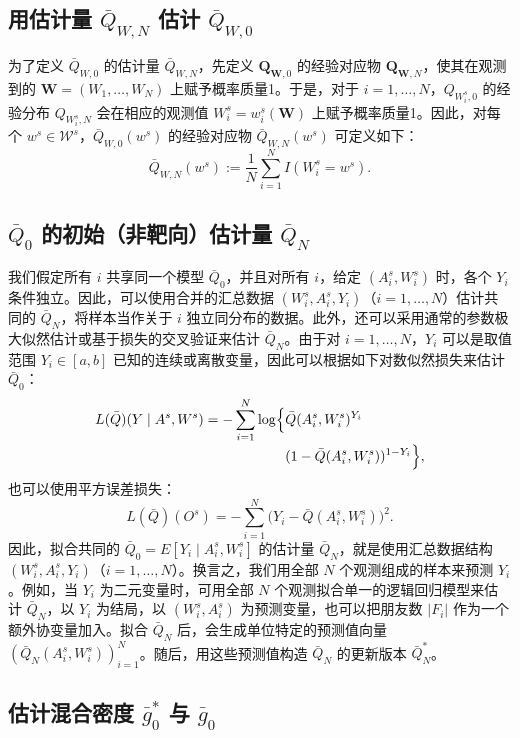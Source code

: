 \subsection{用估计量 \texorpdfstring{$\bar Q_{W,N}$}{QW,N} 估计 \texorpdfstring{$\bar Q_{W,0}$}{QW,0}}

为了定义 $\bar Q_{W,0}$ 的估计量 $\bar Q_{W,N}$，先定义 $\bm Q_{\bm W,0}$ 的经验对应物 $\bm Q_{\bm W,N}$，使其在观测到的 $\bm W=(W_1,\ldots,W_N)$ 上赋予概率质量1。于是，对于 $i=1,\ldots,N$，$Q_{W_i^s,0}$ 的经验分布 $Q_{W_i^s,N}$ 会在相应的观测值 $W_i^s=w_i^s(\bm W)$ 上赋予概率质量1。因此，对每个 $w^s\in\mathcal W^s$，$\bar Q_{W,0}(w^s)$ 的经验对应物 $\bar Q_{W,N}(w^s)$ 可定义如下：
\[
 \bar Q_{W,N}(w^s):=\frac{1}{N}\sum_{i=1}^N I(W_i^s=w^s).
\]

\subsection{\texorpdfstring{$\bar Q_0$}{Q0} 的初始（非靶向）估计量 \texorpdfstring{$\bar Q_N$}{QN}}

我们假定所有 $i$ 共享同一个模型 $\bar Q_0$，并且对所有 $i$，给定 $(A_i^s,W_i^s)$ 时，各个 $Y_i$ 条件独立。因此，可以使用合并的汇总数据 $(W_i^s,A_i^s,Y_i)$（$i=1,\ldots,N$）估计共同的 $\bar Q_N$，将样本当作关于 $i$ 独立同分布的数据。此外，还可以采用通常的参数极大似然估计或基于损失的交叉验证来估计 $\bar Q_N$。由于对 $i=1,\ldots,N$，$Y_i$ 可以是取值范围 $Y_i\in[a,b]$ 已知的连续或离散变量，因此可以根据如下对数似然损失来估计 $\bar Q_0$：
\[
 \begin{aligned}
 L(\bar Q)(Y\mid A^s,W^s)
 =-\sum_{i=1}^N\log\Bigl\{&\bar Q(A_i^s,W_i^s)^{Y_i}\\[-.2em]
 &\mathord{}(1-\bar Q(A_i^s,W_i^s))^{1-Y_i}\Bigr\},
 \end{aligned}
\]
也可以使用平方误差损失：
\[
 L(\bar Q)(O^s)=-\sum_{i=1}^N\bigl(Y_i-\bar Q(A_i^s,W_i^s)\bigr)^2.
\]
因此，拟合共同的 $\bar Q_0=E[Y_i\mid A_i^s,W_i^s]$ 的估计量 $\bar Q_N$，就是使用汇总数据结构 $(W_i^s,A_i^s,Y_i)$（$i=1,\ldots,N$）。换言之，我们用全部 $N$ 个观测组成的样本来预测 $Y_i$。例如，当 $Y_i$ 为二元变量时，可用全部 $N$ 个观测拟合单一的逻辑回归模型来估计 $\bar Q_N$，以 $Y_i$ 为结局，以 $(W_i^s,A_i^s)$ 为预测变量，也可以把朋友数 $|F_i|$ 作为一个额外协变量加入。拟合 $\bar Q_N$ 后，会生成单位特定的预测值向量 $(\bar Q_N(A_i^s,W_i^s))_{i=1}^N$。随后，用这些预测值构造 $\bar Q_N$ 的更新版本 $\bar Q_N^*$。

\subsection{估计混合密度 \texorpdfstring{$\bar g_0^*$ 与 $\bar g_0$}{g0*与g0}}

